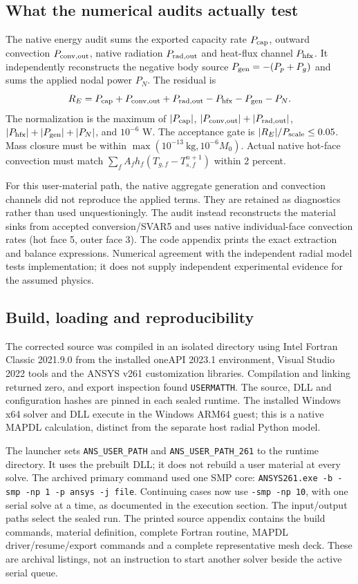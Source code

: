 \documentclass[oneside,openany]{amsdtx}
\begin{document}
\subsection{What the numerical audits actually test}
The native energy audit sums the exported capacity rate $P_{\rm cap}$, outward convection $P_{\rm conv,out}$, native radiation $P_{\rm rad,out}$ and heat-flux channel $P_{\rm hfx}$. It independently reconstructs the negative body source $P_{\rm gen}=-(P_p+P_g)$ and sums the applied nodal power $P_N$. The residual is
\begin{equation}
 R_E=P_{\rm cap}+P_{\rm conv,out}+P_{\rm rad,out}-P_{\rm hfx}-P_{\rm gen}-P_N.
\end{equation}
The normalization is the maximum of $|P_{\rm cap}|$, $|P_{\rm conv,out}|+|P_{\rm rad,out}|$, $|P_{\rm hfx}|+|P_{\rm gen}|+|P_N|$, and $10^{-6}$ W. The acceptance gate is $|R_E|/P_{\rm scale}\leq0.05$. Mass closure must be within $\max(10^{-13}\ \mathrm{kg},10^{-6}M_0)$. Actual native hot-face convection must match $\sum_fA_fh_f(T_{g,f}-T_{s,f}^{n+1})$ within 2 percent.

For this user-material path, the native aggregate generation and convection channels did not reproduce the applied terms. They are retained as diagnostics rather than used unquestioningly. The audit instead reconstructs the material sinks from accepted conversion/SVAR5 and uses native individual-face convection rates (hot face 5, outer face 3). The code appendix prints the exact extraction and balance expressions. Numerical agreement with the independent radial model tests implementation; it does not supply independent experimental evidence for the assumed physics.

\subsection{Build, loading and reproducibility}
The corrected source was compiled in an isolated directory using Intel Fortran Classic 2021.9.0 from the installed oneAPI 2023.1 environment, Visual Studio 2022 tools and the ANSYS v261 customization libraries. Compilation and linking returned zero, and export inspection found \texttt{USERMATTH}. The source, DLL and configuration hashes are pinned in each sealed runtime. The installed Windows x64 solver and DLL execute in the Windows ARM64 guest; this is a native MAPDL calculation, distinct from the separate host radial Python model.

The launcher sets \texttt{ANS\_USER\_PATH} and \texttt{ANS\_USER\_PATH\_261} to the runtime directory. It uses the prebuilt DLL; it does not rebuild a user material at every solve. The archived primary command used one SMP core: \texttt{ANSYS261.exe -b -smp -np 1 -p ansys -j file}. Continuing cases now use \texttt{-smp -np 10}, with one serial solve at a time, as documented in the execution section. The input/output paths select the sealed run. The printed source appendix contains the build commands, material definition, complete Fortran routine, MAPDL driver/resume/export commands and a complete representative mesh deck. These are archival listings, not an instruction to start another solver beside the active serial queue.
\end{document}
